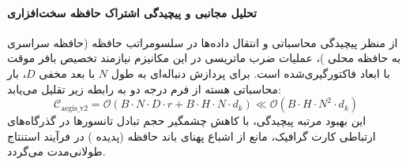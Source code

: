 \paragraph{تحلیل مجانبی و پیچیدگی اشتراک حافظه سخت‌افزاری}
از منظر پیچیدگی محاسباتی و انتقال داده‌ها در سلسومراتب حافظه (حافظه سراسری  به حافظه محلی )، عملیات ضرب ماتریسی در این مکانیزم نیازمند تخصیص بافر موقت با ابعاد فاکتورگیری‌شده است. برای پردازش دنباله‌ای به طول $N$ با بعد مخفی $D$، بار محاسباتی هسته از فرم درجه دو به رابطه زیر تقلیل می‌یابد:
\begin{equation}
\label{eq:complexity_aegis_v2}
\mathcal{C}_{\text{aegis\_v2}} = \mathcal{O}\left( B \cdot N \cdot D \cdot r + B \cdot H \cdot N \cdot d_k \right) \ll \mathcal{O}\left( B \cdot H \cdot N^2 \cdot d_k \right)
\end{equation}
این بهبود مرتبه پیچیدگی، با کاهش چشمگیر حجم تبادل تانسورها در گذرگاه‌های ارتباطی کارت گرافیک، مانع از اشباع پهنای باند حافظه (پدیده ) در فرآیند استنتاج طولانی‌مدت می‌گردد.
